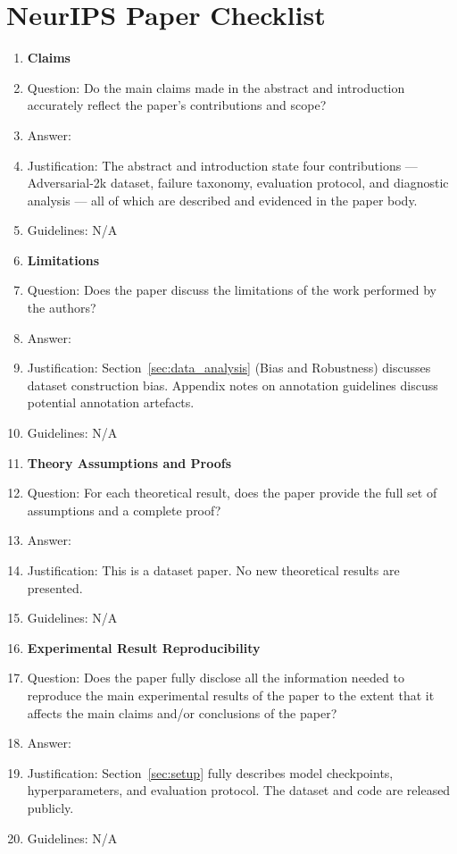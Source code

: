 \section*{NeurIPS Paper Checklist}

\begin{enumerate}

\item {\bf Claims}
\item[] Question: Do the main claims made in the abstract and introduction accurately reflect the paper's contributions and scope?
\item[] Answer: \answerYes{}
\item[] Justification: The abstract and introduction state four contributions — Adversarial-2k dataset, failure taxonomy, evaluation protocol, and diagnostic analysis — all of which are described and evidenced in the paper body.
\item[] Guidelines: N/A

\item {\bf Limitations}
\item[] Question: Does the paper discuss the limitations of the work performed by the authors?
\item[] Answer: \answerYes{}
\item[] Justification: Section~\ref{sec:data_analysis} (Bias and Robustness) discusses dataset construction bias. Appendix notes on annotation guidelines discuss potential annotation artefacts.
\item[] Guidelines: N/A

\item {\bf Theory Assumptions and Proofs}
\item[] Question: For each theoretical result, does the paper provide the full set of assumptions and a complete proof?
\item[] Answer: \answerNA{}
\item[] Justification: This is a dataset paper. No new theoretical results are presented.
\item[] Guidelines: N/A

\item {\bf Experimental Result Reproducibility}
\item[] Question: Does the paper fully disclose all the information needed to reproduce the main experimental results of the paper to the extent that it affects the main claims and/or conclusions of the paper?
\item[] Answer: \answerYes{}
\item[] Justification: Section~\ref{sec:setup} fully describes model checkpoints, hyperparameters, and evaluation protocol. The dataset and code are released publicly.
\item[] Guidelines: N/A


\end{enumerate}
